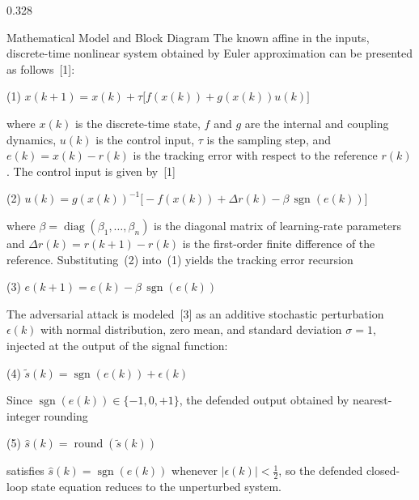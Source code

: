\documentclass[final]{beamer}
\newlength{\rowBh}          \setlength{\rowBh}{52.1cm}
\begin{document}
\begin{frame}[t]
\begin{center}
\begin{minipage}{0.975\textwidth}
			\begin{minipage}[t][\rowBh]{\linewidth}
				\begin{columns}[T,totalwidth=\linewidth]
					\begin{column}{0.328\linewidth}
						\begin{posterpanel}[height=\rowBh]{Mathematical Model and Block Diagram}
							The known affine in the inputs, discrete-time nonlinear system
							obtained by Euler approximation can be presented as follows~[1]:
							\begin{postereqbox}{(1)}
								$x(k{+}1)=x(k)+\tau\bigl[f(x(k))+g(x(k))u(k)\bigr]$
							\end{postereqbox}
							where $x(k)$ is the discrete-time state, $f$ and $g$ are the internal
							and coupling dynamics, $u(k)$ is the control input, $\tau$ is the
							sampling step, and $e(k)=x(k)-r(k)$ is the tracking error with respect
							to the reference $r(k)$. The control input is given by~[1]
							\begin{postereqbox}{(2)}
								$u(k)=g(x(k))^{-1}\bigl[-f(x(k))+\Delta r(k)-\beta\,\operatorname{sgn}(e(k))\bigr]$
							\end{postereqbox}
							where $\beta=\operatorname{diag}(\beta_1,\ldots,\beta_n)$ is the
							diagonal matrix of learning-rate parameters and
							$\Delta r(k)=r(k{+}1)-r(k)$ is the first-order finite difference of
							the reference. Substituting~(2) into~(1) yields the tracking error
							recursion
							\begin{postereqbox}{(3)}
								$e(k{+}1)=e(k)-\beta\,\operatorname{sgn}(e(k))$
							\end{postereqbox}
							The adversarial attack is modeled~[3] as an additive stochastic
							perturbation $\epsilon(k)$ with normal distribution, zero mean, and
							standard deviation $\sigma=1$, injected at the output of the signal
							function:
							\begin{postereqbox}{(4)}
								$\widetilde{s}(k)=\operatorname{sgn}(e(k))+\epsilon(k)$
							\end{postereqbox}
							Since $\operatorname{sgn}(e(k))\in\{-1,0,+1\}$, the defended output
							obtained by nearest-integer rounding
							\begin{postereqbox}{(5)}
								$\hat{s}(k)=\operatorname{round}(\widetilde{s}(k))$
							\end{postereqbox}
							satisfies $\hat{s}(k)=\operatorname{sgn}(e(k))$ whenever
							$|\epsilon(k)|<\tfrac{1}{2}$, so the defended closed-loop state
							equation reduces to the unperturbed system.


\end{posterpanel}
\end{column}
\end{columns}
\end{minipage}
\end{minipage}
\end{center}
\end{frame}
\end{document}
